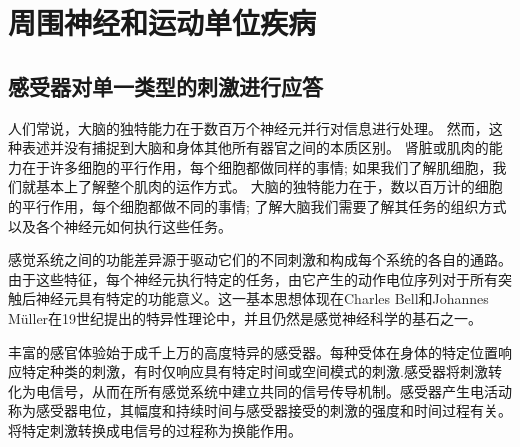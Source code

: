 \chapter{周围神经和运动单位疾病}


\section{感受器对单一类型的刺激进行应答}
人们常说，大脑的独特能力在于数百万个神经元并行对信息进行处理。
然而，这种表述并没有捕捉到大脑和身体其他所有器官之间的本质区别。
肾脏或肌肉的能力在于许多细胞的平行作用，每个细胞都做同样的事情; 
如果我们了解肌细胞，我们就基本上了解整个肌肉的运作方式。
大脑的独特能力在于，数以百万计的细胞的平行作用，每个细胞都做不同的事情; 
了解大脑我们需要了解其任务的组织方式以及各个神经元如何执行这些任务。

感觉系统之间的功能差异源于驱动它们的不同刺激和构成每个系统的各自的通路。由于这些特征，每个神经元执行特定的任务，由它产生的动作电位序列对于所有突触后神经元具有特定的功能意义。这一基本思想体现在Charles Bell和Johannes Müller在19世纪提出的特异性理论中，并且仍然是感觉神经科学的基石之一。

丰富的感官体验始于成千上万的高度特异的感受器。每种受体在身体的特定位置响应特定种类的刺激，有时仅响应具有特定时间或空间模式的刺激.感受器将刺激转化为电信号，从而在所有感觉系统中建立共同的信号传导机制。感受器产生电活动称为感受器电位，其幅度和持续时间与感受器接受的刺激的强度和时间过程有关。将特定刺激转换成电信号的过程称为换能作用。


